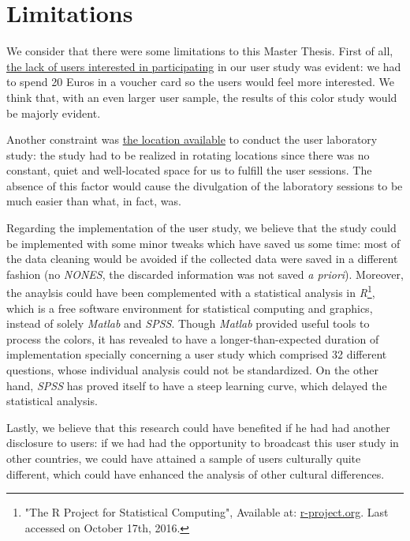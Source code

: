 \section{Limitations}
\label{sec:limitations}
%
We consider that there were some limitations to this Master Thesis. First of all, \ul{the lack of users interested in participating} in our user study was
evident: we had to spend 20 Euros in a voucher card so the users would feel more interested. We think that, with an even larger user sample, the results
of this color study would be majorly evident. \par
%
Another constraint was \ul{the location available} to conduct the user laboratory study: the study had to be realized in rotating locations since there was
no constant, quiet and well-located space for us to fulfill the user sessions. The absence of this factor would cause the divulgation of the laboratory
sessions to be much easier than what, in fact, was. \par
%
Regarding the implementation of the user study, we believe that the study could be implemented with some minor tweaks which have saved us some time: most
of the data cleaning would be avoided if the collected data were saved in a different fashion (no \emph{NONES}, the discarded information was not saved
\emph{a priori}). Moreover, the anaylsis could have been complemented with a statistical analysis in \emph{R}\footnote{"The R Project for Statistical Computing", Available at:
\url{r-project.org}. Last accessed on October 17th, 2016.}, which is a free software environment for statistical computing and graphics, instead of solely
\emph{Matlab} and \emph{SPSS}. Though \emph{Matlab} provided useful tools to process the colors, it has revealed to have a longer-than-expected duration of implementation
specially concerning a user study which comprised 32 different questions, whose individual analysis could not be standardized. On the other hand, \emph{SPSS}
has proved itself to have a steep learning curve, which delayed the statistical analysis. \par
%
Lastly, we believe that this research could have benefited if he had had another disclosure to users: if we had had the opportunity to broadcast this user
study in other countries, we could have attained a sample of users culturally quite different, which could have enhanced the analysis of other cultural
differences.
%
